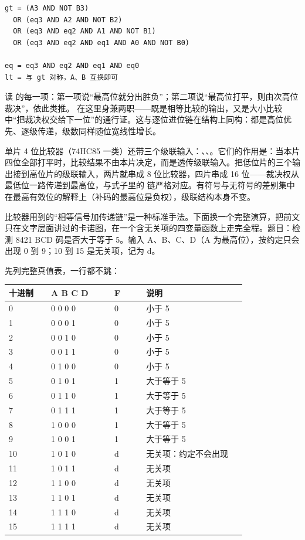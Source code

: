 \begin{lstlisting}
gt = (A3 AND NOT B3)
  OR (eq3 AND A2 AND NOT B2)
  OR (eq3 AND eq2 AND A1 AND NOT B1)
  OR (eq3 AND eq2 AND eq1 AND A0 AND NOT B0)

eq = eq3 AND eq2 AND eq1 AND eq0
lt = 与 gt 对称，A、B 互换即可
\end{lstlisting}

读  的每一项：第一项说“最高位就分出胜负”；第二项说“最高位打平，则由次高位裁决”，依此类推。 在这里身兼两职——既是相等比较的输出，又是大小比较中“把裁决权交给下一位”的通行证。这与逐位进位链在结构上同构：都是高位优先、逐级传递，级数同样随位宽线性增长。

单片 4 位比较器（74HC85 一类）还带三个级联输入：、、。它们的作用是：当本片四位全部打平时，比较结果不由本片决定，而是透传级联输入。把低位片的三个输出接到高位片的级联输入，两片就串成 8 位比较器，四片串成 16 位——裁决权从最低位一路传递到最高位，与式子里的  链严格对应。有符号与无符号的差别集中在最高有效位的解释上（补码的最高位是负权），级联结构本身不变。

比较器用到的“相等信号加传递链”是一种标准手法。下面换一个完整演算，把前文只在文字层面讲过的卡诺图，在一个含无关项的四变量函数上走完全程。题目：检测 8421 BCD 码是否大于等于 5。输入 A、B、C、D（A 为最高位），按约定只会出现 0 到 9；10 到 15 是无关项，记为 d。

先列完整真值表，一行都不跳：

\begin{longtable}{L{0.16\linewidth}L{0.24\linewidth}L{0.12\linewidth}L{0.38\linewidth}}
\toprule
十进制 & A B C D & F & 说明 \\
 & 0 0 0 0 & 0 & 小于 5 \\
1 & 0 0 0 1 & 0 & 小于 5 \\
2 & 0 0 1 0 & 0 & 小于 5 \\
3 & 0 0 1 1 & 0 & 小于 5 \\
4 & 0 1 0 0 & 0 & 小于 5 \\
5 & 0 1 0 1 & 1 & 大于等于 5 \\
6 & 0 1 1 0 & 1 & 大于等于 5 \\
7 & 0 1 1 1 & 1 & 大于等于 5 \\
8 & 1 0 0 0 & 1 & 大于等于 5 \\
9 & 1 0 0 1 & 1 & 大于等于 5 \\
10 & 1 0 1 0 & d & 无关项：约定不会出现 \\
11 & 1 0 1 1 & d & 无关项 \\
12 & 1 1 0 0 & d & 无关项 \\
13 & 1 1 0 1 & d & 无关项 \\
14 & 1 1 1 0 & d & 无关项 \\
15 & 1 1 1 1 & d & 无关项 \\
\bottomrule
\end{longtable}

